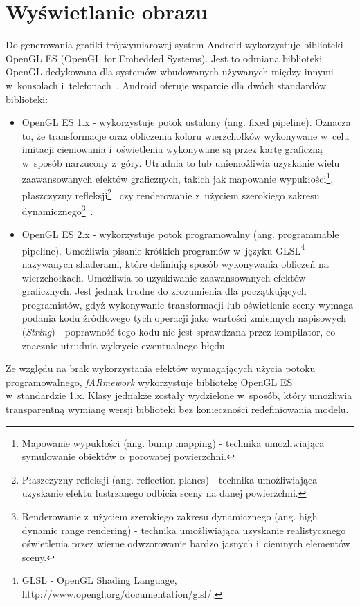 \documentclass[a4paper,twocolumn,11pt]{article}
\begin{document}
\section{Wyświetlanie obrazu}

Do generowania grafiki trójwymiarowej system Android wykorzystuje biblioteki OpenGL ES (OpenGL for Embedded Systems).
Jest to odmiana biblioteki OpenGL dedykowana dla systemów wbudowanych używanych między innymi w~konsolach i~telefonach~\cite{ogl:es}.
Android oferuje wsparcie dla dwóch standardów biblioteki:

\begin{itemize}
 \item OpenGL ES 1.x - wykorzystuje potok ustalony (ang. fixed pipeline).
  Oznacza to, że transformacje oraz obliczenia koloru wierzchołków wykonywane w~celu imitacji cieniowania i~oświetlenia wykonywane są przez kartę graficzną w~sposób narzucony z~góry.
  Utrudnia to lub uniemożliwia uzyskanie wielu zaawansowanych efektów graficznych, takich jak mapowanie wypukłości\footnote{Mapowanie wypukłości (ang. bump mapping) - technika umożliwiająca symulowanie obiektów o~porowatej powierzchni.}, płaszczyzny refleksji\footnote{Płaszczyzny refleksji (ang. reflection planes) - technika umożliwiająca uzyskanie efektu lustrzanego odbicia sceny na danej powierzchni.}~\cite{tec:3d} czy renderowanie z~użyciem szerokiego zakresu dynamicznego\footnote{Renderowanie z~użyciem szerokiego zakresu dynamicznego (ang. high dynamic range rendering) - technika umożliwiająca uzyskanie realistycznego oświetlenia przez wierne odwzorowanie bardzo jasnych i~ciemnych elementów sceny.}~\cite{nvi:hdr}. 
 \item OpenGL ES 2.x - wykorzystuje potok programowalny (ang. programmable pipeline).
  Umożliwia pisanie krótkich programów w~języku GLSL\footnote{GLSL - OpenGL Shading Language, http://www.opengl.org/documentation/glsl/.} nazywanych shaderami, które definiują sposób wykonywania obliczeń na wierzchołkach.
  Umożliwia to uzyskiwanie zaawansowanych efektów graficznych. Jest jednak trudne do zrozumienia dla początkujących programistów, gdyż wykonywanie transformacji lub oświetlenie sceny wymaga podania kodu źródłowego tych operacji jako wartości zmiennych napisowych (\emph{String}) - poprawność tego kodu nie jest sprawdzana przez kompilator, co znacznie utrudnia wykrycie ewentualnego błędu.
\end{itemize}

Ze względu na brak wykorzystania efektów wymagających użycia potoku programowalnego, \emph{fARmework} wykorzystuje bibliotekę OpenGL ES w~standardzie 1.x.
Klasy jednakże zostały wydzielone w~sposób, który umożliwia transparentną wymianę wersji biblioteki bez konieczności redefiniowania modelu.
\end{document}

